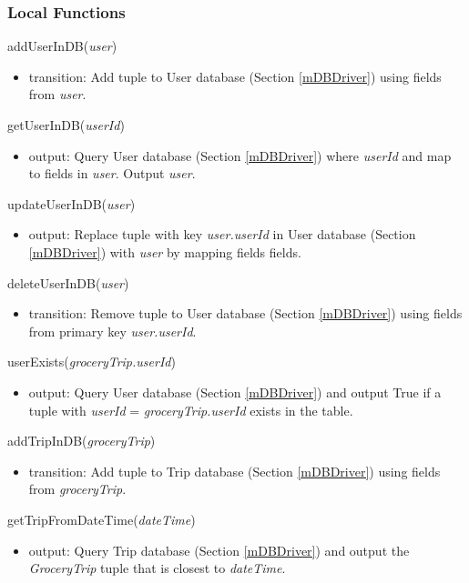 \documentclass[12pt, titlepage]{article}
\begin{document}
\subsubsection{Local Functions}
addUserInDB(\textit{user})
\begin{itemize}
\item transition: Add tuple to User database (Section \ref{mDBDriver}) using fields from \textit{user}.
\end{itemize}

\noindent getUserInDB(\textit{userId})
\begin{itemize}
\item output:  Query User database (Section \ref{mDBDriver}) where \textit{userId} and map to fields in \textit{user}. Output \textit{user}.
\end{itemize}

\noindent updateUserInDB(\textit{user})
\begin{itemize}
\item output:  Replace tuple with key \textit{user.userId} in User database (Section \ref{mDBDriver}) with \textit{user} by mapping fields fields.
\end{itemize}

\noindent deleteUserInDB(\textit{user})
\begin{itemize}
\item transition: Remove tuple to User database (Section \ref{mDBDriver}) using fields from primary key \textit{user.userId}.
\end{itemize}

\noindent userExists(\textit{groceryTrip.userId})
\begin{itemize}
\item output: Query User database (Section \ref{mDBDriver}) and output True if a tuple with \textit{userId} = \textit{groceryTrip.userId} exists in the table.
\end{itemize}

\noindent addTripInDB(\textit{groceryTrip})
\begin{itemize}
\item transition: Add tuple to Trip database (Section \ref{mDBDriver}) using fields from \textit{groceryTrip}.
\end{itemize}

\noindent getTripFromDateTime(\textit{dateTime})
\begin{itemize}
\item output: Query Trip database (Section \ref{mDBDriver}) and output the \textit{GroceryTrip} tuple that is closest to \textit{dateTime}.
\end{itemize}
\end{document}

